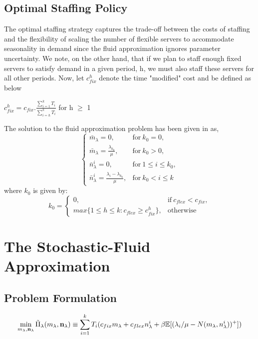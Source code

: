 \subsection{Optimal Staffing Policy} 
The optimal staffing strategy captures the trade-off between the costs of staffing and the flexibility of scaling the number of flexible servers to accommodate seasonality in demand since the fluid approximation ignores parameter uncertainty. We note, on the other hand, that if we plan to staff enough fixed servers to satisfy demand in a given period, h, we must also staff these servers for all other periods. Now, let $c_{fix}^h$ denote the time "modified" cost and be defined as below \\
\begin{center}
$c_{fix}^h = c_{fix}.\frac{\sum_{i=1}^k T_i}{\sum_{i=h}^k T_i}$ for h $\geq$ 1 \\    
\end{center}
\begin{lemma}
The solution to the fluid approximation problem has been given in \cite{dong} as, 
$$
\begin{cases}
      \bar{m}_{\lambda} = 0, & \text{for}\ k_0=0, \\
      \bar{m}_{\lambda} = \frac{\lambda_{k_0}}{\mu}, & \text{for}\ k_0>0, \\
      \bar{n}_{\lambda}^i = 0, & \text{for}\ 1 \leq i \leq k_0, \\
      \bar{n}_{\lambda}^i = \frac{\lambda_i - \lambda_{k_0}}{\mu}, & \text{for}\ k_0 < i \leq k 
    \end{cases}
$$
where $k_0$ is given by:
$$
k_0 = 
\begin{cases}
      0, & \text{if}\ c_{flex} < c_{fix}, \\
      max\{1 \leq h \leq k: c_{flex} \geq c_{fix}^h\}, & \text{otherwise}
    \end{cases}
$$

\end{lemma}
\section{The Stochastic-Fluid Approximation} 
\subsection{Problem Formulation} 
\[\min_{m_{\lambda},\bold{n}_{\lambda}} \tilde{\Pi}_{\lambda}(m_{\lambda},\bold{n}_{\lambda}) \equiv \sum_{i=1}^{k} T_i(c_{fix}m_{\lambda} + c_{flex}n_{\lambda}^i + \beta\mathbb{E}[(\lambda_i/\mu - N(m_{\lambda},n_{\lambda}^i))^+])\]
